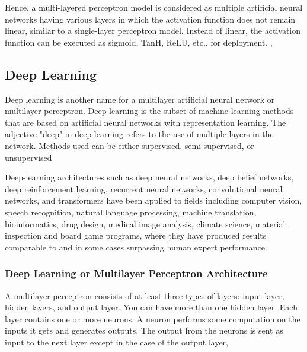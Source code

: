 \begin{enumerate}
    Hence, a multi-layered perceptron model is considered as multiple artificial neural networks having various layers in which the activation function does not remain linear, similar to a single-layer perceptron model. Instead of linear, the activation function can be executed as sigmoid, TanH, ReLU, etc., for deployment. \cite{ansari2020building}, \cite{nielsen2015neural}
\end{enumerate}

\subsection{Deep Learning}
Deep learning is another name for a multilayer artificial neural network or multilayer perceptron. Deep learning is the subset of machine learning methods that are based on artificial neural networks with representation learning. The adjective "deep" in deep learning refers to the use of multiple layers in the network. Methods used can be either supervised, semi-supervised, or unsupervised \cite{vargas2017deep}

Deep-learning architectures such as deep neural networks, deep belief networks, deep reinforcement learning, recurrent neural networks, convolutional neural networks, and transformers have been applied to fields including computer vision, speech recognition, natural language processing, machine translation, bioinformatics, drug design, medical image analysis, climate science, material inspection and board game programs, where they have produced results comparable to and in some cases surpassing human expert performance. \cite{hosseini2020deep}

\subsubsection{Deep Learning or Multilayer Perceptron Architecture}
A multilayer perceptron consists of at least three types of layers: input layer, hidden layers, and output layer. You can have more than one hidden layer. Each layer contains one or more neurons. A neuron performs some computation on the inputs it gets and generates outputs. The output from the neurons is sent as input to the next layer except in the case of the output layer,

